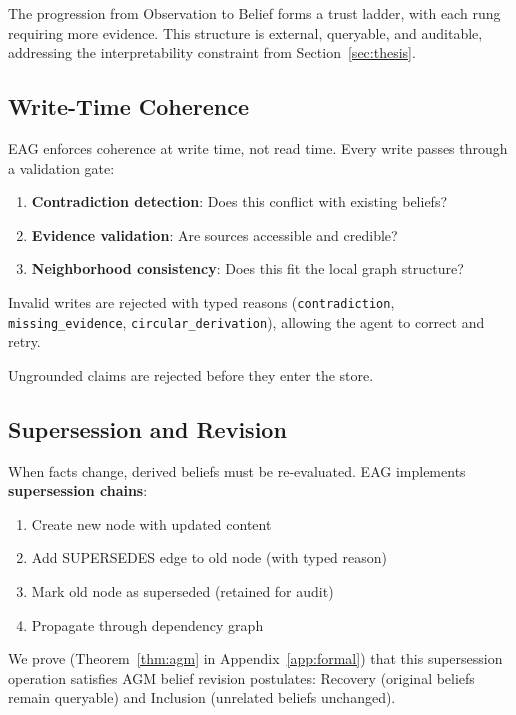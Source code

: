 \documentclass[11pt,letterpaper]{article}
\begin{document}
The progression from Observation to Belief forms a trust ladder, with each rung requiring more evidence. This structure is external, queryable, and auditable, addressing the interpretability constraint from Section~\ref{sec:thesis}.

\subsection{Write-Time Coherence}

EAG enforces coherence at write time, not read time. Every write passes through a validation gate:

\begin{enumerate}[noitemsep]
    \item \textbf{Contradiction detection}: Does this conflict with existing beliefs?
    \item \textbf{Evidence validation}: Are sources accessible and credible?
    \item \textbf{Neighborhood consistency}: Does this fit the local graph structure?
\end{enumerate}

Invalid writes are rejected with typed reasons (\texttt{contradiction}, \texttt{missing\_evidence}, \texttt{circular\_derivation}), allowing the agent to correct and retry.

Ungrounded claims are rejected before they enter the store.

\subsection{Supersession and Revision}

When facts change, derived beliefs must be re-evaluated. EAG implements \textbf{supersession chains}:

\begin{enumerate}[noitemsep]
    \item Create new node with updated content
    \item Add SUPERSEDES edge to old node (with typed reason)
    \item Mark old node as superseded (retained for audit)
    \item Propagate through dependency graph
\end{enumerate}

We prove (Theorem~\ref{thm:agm} in Appendix~\ref{app:formal}) that this supersession operation satisfies AGM belief revision postulates: Recovery (original beliefs remain queryable) and Inclusion (unrelated beliefs unchanged).
\end{document}
